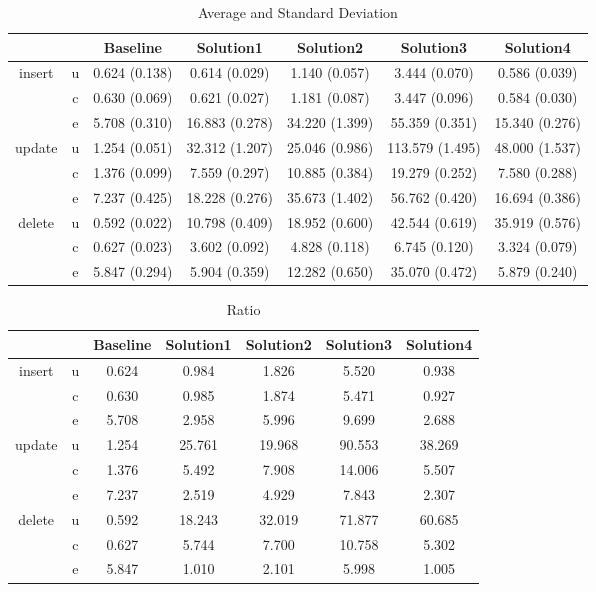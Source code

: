 \begin{table}[h]
\newcommand{\B}[1]{\colorbox{light-gray}{#1}}
 \centering
\caption{Average and Standard Deviation}\label{t:}
\begin{tabular}{ccccccc}
\toprule
&&Baseline & Solution1 & Solution2 & Solution3 & Solution4\\
\midrule
\multirow{3}{*}{insert} & u & 0.624 (0.138) & 0.614 (0.029) & 1.140 (0.057) & 3.444 (0.070) & 0.586 (0.039)\\
 & c & 0.630 (0.069) & 0.621 (0.027) & 1.181 (0.087) & 3.447 (0.096) & 0.584 (0.030)\\
 & e & 5.708 (0.310) & 16.883 (0.278) & 34.220 (1.399) & 55.359 (0.351) & 15.340 (0.276)\\
\midrule
\multirow{3}{*}{update} & u & 1.254 (0.051) & 32.312 (1.207) & 25.046 (0.986) & 113.579 (1.495) & 48.000 (1.537)\\
 & c & 1.376 (0.099) & 7.559 (0.297) & 10.885 (0.384) & 19.279 (0.252) & 7.580 (0.288)\\
 & e & 7.237 (0.425) & 18.228 (0.276) & 35.673 (1.402) & 56.762 (0.420) & 16.694 (0.386)\\
\midrule
\multirow{3}{*}{delete} & u & 0.592 (0.022) & 10.798 (0.409) & 18.952 (0.600) & 42.544 (0.619) & 35.919 (0.576)\\
 & c & 0.627 (0.023) & 3.602 (0.092) & 4.828 (0.118) & 6.745 (0.120) & 3.324 (0.079)\\
 & e & 5.847 (0.294) & 5.904 (0.359) & 12.282 (0.650) & 35.070 (0.472) & 5.879 (0.240)\\
\bottomrule
\end{tabular}
\end{table}



\begin{table}[h]
\newcommand{\B}[1]{\colorbox{light-gray}{#1}}
 \centering
\caption{Ratio}\label{t:}
\begin{tabular}{ccccccc}
\toprule
&&Baseline & Solution1 & Solution2 & Solution3 & Solution4\\
\midrule
\multirow{3}{*}{insert} & u & 0.624 & 0.984 & 1.826 & 5.520 & 0.938\\
 & c & 0.630 & 0.985 & 1.874 & 5.471 & 0.927\\
 & e & 5.708 & 2.958 & 5.996 & 9.699 & 2.688\\
\midrule
\multirow{3}{*}{update} & u & 1.254 & 25.761 & 19.968 & 90.553 & 38.269\\
 & c & 1.376 & 5.492 & 7.908 & 14.006 & 5.507\\
 & e & 7.237 & 2.519 & 4.929 & 7.843 & 2.307\\
\midrule
\multirow{3}{*}{delete} & u & 0.592 & 18.243 & 32.019 & 71.877 & 60.685\\
 & c & 0.627 & 5.744 & 7.700 & 10.758 & 5.302\\
 & e & 5.847 & 1.010 & 2.101 & 5.998 & 1.005\\
\bottomrule
\end{tabular}
\end{table}






